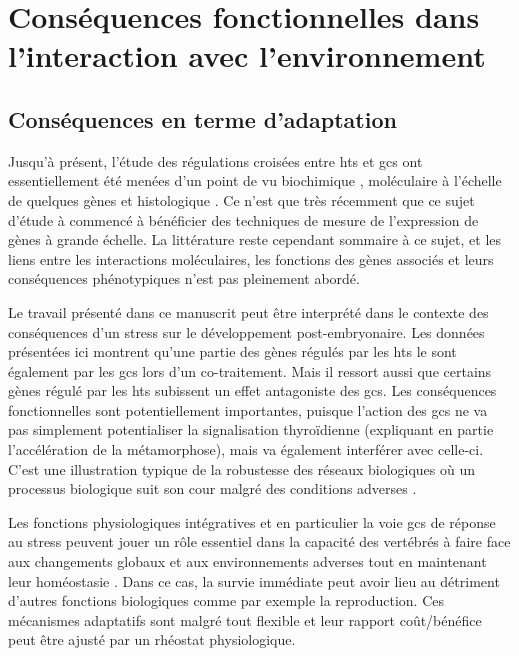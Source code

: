\documentclass[../main.tex]{subfiles}
\begin{document}
\chapter{Conséquences fonctionnelles dans l'interaction avec l'environnement}


\section{Conséquences en terme d'adaptation}

Jusqu'à présent, l'étude des régulations croisées entre \glspl{ht} et \glspl{gc} ont essentiellement été menées d'un point de vu biochimique \citep{Kikuyama1982,Galton1990}, moléculaire à l’échelle de quelques gènes \citep{Bagamasbad2008,Krain2004,Gil-Ibanez2014} et histologique \citep{Denver1993}.
Ce n’est que très récemment que ce sujet d'étude à commencé à bénéficier des techniques de mesure de l'expression de gènes à grande échelle.
La littérature reste cependant sommaire à ce sujet, et les liens entre les interactions moléculaires, les fonctions des gènes associés et leurs conséquences phénotypiques n'est pas pleinement abordé.
\par
Le travail présenté dans ce manuscrit peut être interprété dans le contexte des conséquences d'un stress sur le développement post-embryonaire.
Les données présentées ici montrent qu'une partie des gènes régulés par les \glspl{ht} le sont également par les \glspl{gc} lors d'un co-traitement.
Mais il ressort aussi que certains gènes régulé par les \glspl{ht} subissent un effet antagoniste des \glspl{gc}.
Les conséquences fonctionnelles sont potentiellement importantes, puisque l'action des \glspl{gc} ne va pas simplement potentialiser la signalisation thyroïdienne (expliquant en partie l'accélération de la métamorphose), mais va également interférer avec celle-ci.
C'est une illustration typique de la robustesse des réseaux biologiques où un processus biologique suit son cour malgré des conditions adverses \citep{Kitano2004}.
\par
Les fonctions physiologiques intégratives et en particulier la voie \glspl{gc} de réponse au stress peuvent jouer un rôle essentiel dans la capacité des vertébrés à faire face aux changements globaux et aux environnements adverses tout en maintenant leur homéostasie \citep{Angelier2013}.
Dans ce cas, la survie immédiate peut avoir lieu au détriment d'autres fonctions biologiques comme par exemple la reproduction. Ces mécanismes adaptatifs sont malgré tout flexible et leur rapport coût/bénéfice peut être ajusté par un rhéostat physiologique.
\end{document}
